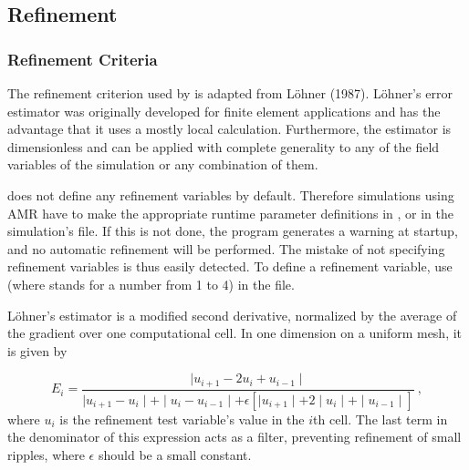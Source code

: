 \subsection{Refinement}
\label{Sec: refinement}
\subsubsection{Refinement Criteria}
The refinement criterion used by \Paramesh is adapted from L\"ohner (1987).
L\"ohner's error estimator was originally developed for finite element
applications and has the advantage that it uses a mostly  local
calculation. Furthermore, the estimator is dimensionless and can be
applied with complete generality to any of the field variables of the
simulation or any combination of them.

\begin{flashtip}
\flashx does not define any refinement variables by default.
Therefore simulations using AMR have to make the appropriate runtime parameter
definitions in , or in the simulation's  file.
If this is not done, the program generates a warning at startup, and no
automatic refinement will be performed. The mistake of
not specifying refinement variables
is thus easily detected.
To define a refinement variable, use 
(where \code{\#} stands for a number from 1 to 4)
in the  file.
\end{flashtip}

L\"ohner's estimator is a modified second
derivative, normalized by the average of the gradient over one
computational cell. In one dimension on a uniform mesh, it is given by

\begin{equation}
E_{i} = { \frac{ \mid u_{i+1} - 2u_{i} + u_{i-1} \mid}
         { \mid u_{i+1} - u_{i} \mid + \mid u_{i} - u_{i-1} \mid +
              \epsilon [ \mid u_{i+1} \mid + 2 \mid  u_{i} \mid +
                          \mid u_{i-1} \mid ] }\ } ,
\end{equation}
where $u_i$ is the refinement test variable's value in the $i$th
cell. The last term in the denominator of this expression acts as a
filter, preventing refinement of small ripples, where $\epsilon$
should be a small constant.


